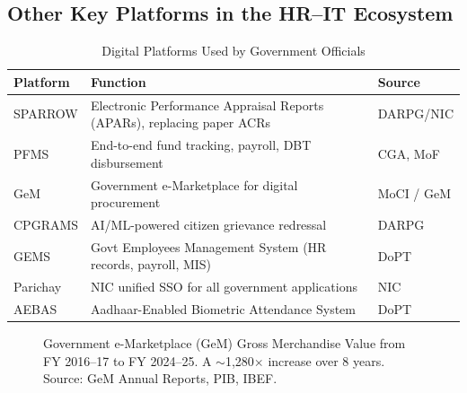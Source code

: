 \documentclass[12pt,a4paper]{article}
\newcommand{\INR}{{\hindifont ₹}}
\begin{document}
\subsection{Other Key Platforms in the HR--IT Ecosystem}

\begin{table}[H]
\centering
\caption{Digital Platforms Used by Government Officials}
\label{tab:platforms}
\begin{tabularx}{\textwidth}{@{}lXl@{}}
\toprule
\textbf{Platform} & \textbf{Function} & \textbf{Source} \\
\midrule
SPARROW & Electronic Performance Appraisal Reports (APARs), replacing paper ACRs & DARPG/NIC \\
PFMS & End-to-end fund tracking, payroll, DBT disbursement & CGA, MoF \\
GeM & Government e-Marketplace for digital procurement & MoCI / GeM \\
CPGRAMS & AI/ML-powered citizen grievance redressal & DARPG \\
GEMS & Govt Employees Management System (HR records, payroll, MIS) & DoPT \\
Parichay & NIC unified SSO for all government applications & NIC \\
AEBAS & Aadhaar-Enabled Biometric Attendance System & DoPT \\
\bottomrule
\end{tabularx}
\end{table}

\begin{figure}[H]
\centering
{}
\caption{Government e-Marketplace (GeM) Gross Merchandise Value from FY 2016--17 to FY 2024--25. A $\sim$1,280$\times$ increase over 8 years. Source: GeM Annual Reports, PIB, IBEF.}
\label{fig:gem_growth}
\end{figure}
\end{document}
